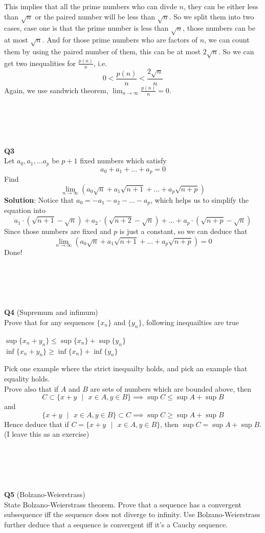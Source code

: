 \documentclass{article}
\newcommand{\tb}[1]{\textbf{#1}}
\begin{document}
This implies that all the prime numbers who can divde $n$, they can be either less than $\sqrt{n}$ or the paired
number will be less than $\sqrt{n}$. So we split them into two cases, case one is that the prime number is less than
$\sqrt{n}$, those numbers can be at most $\sqrt{n}$. And for those prime numbers who are factors of $n$, we can count them 
by using the paired number of them, this can be at most $2\sqrt{n}$. So we can get two inequalities for $\frac{p(n)}{n}$, i.e.
$$
0< \frac{p(n)}{n} < \frac{2\sqrt{n}}{n}
$$
Again, we use sandwich theorem, $\lim_{n \to \infty} \frac{p(n)}{n} = 0$.\\
\\
\\
\\
\\
\\
\tb{Q3}\\
Let $a_0, a_1, \dots a_p$ be $p+1$ fixed numbers which satisfy 
$$
a_0 + a_1 + \dots + a_p = 0
$$
Find 
$$
\lim_{n \to \infty} (a_0 \sqrt{n} + a_1 \sqrt{n+1} + \dots + a_p \sqrt{n+p})
$$
\tb{Solution}: Notice that $a_0 = - a_1 - a_2 -\dots - a_p$, which helps us to simplify the equation into
$$
a_1 \cdot (\sqrt{n+1}-\sqrt{n}) + a_2 \cdot (\sqrt{n+2}-\sqrt{n}) + \dots + a_p \cdot (\sqrt{n+p}-\sqrt{n})
$$
Since those numbers are fixed and $p$ is just a constant, so we can deduce that
$$
\lim_{n \to \infty} (a_0 \sqrt{n} + a_1 \sqrt{n+1} + \dots + a_p \sqrt{n+p}) = 0
$$
Done!\\
\\
\\
\\
\\
\\
\tb{Q4} (Supremum and infimum)\\
Prove that for any sequences $\{x_n\}$ and $\{y_n\}$, following inequailties are true
\begin{center}
    $\sup\{x_n + y_n\} \leq \sup\{x_n\} + \sup\{y_n\}$\\
    $\inf\{x_n + y_n\} \geq \inf\{x_n\} + \inf\{y_n\}$
\end{center}
Pick one example where the strict inequailty holds, and pick an example that equality holds.\\ Prove also that 
if $A$ and $B$ are sets of numbers which are bounded above, then
$$
C \subset \{x+y\text{ }|\text{ }x\in A, y \in B\} \implies \sup C \leq \sup A + \sup B
$$
and
$$
\{x+y\text{ }|\text{ }x\in A, y \in B\} \subset C \implies \sup C \geq \sup A + \sup B
$$
Hence deduce that if $C = \{x+y\text{ }|\text{ }x\in A, y \in B\}$, then $\sup C = \sup A + \sup B$.\\
(I leave this as an exercise)\\
\\
\\
\\
\\
\\
\tb{Q5} (Bolzano-Weierstrass)\\
State Bolzano-Weierstrass theorem. Prove that a sequence has a convergent subsequence iff the sequence does not diverge to infinity. 
Use Bolzano-Weierstrass further deduce that a sequence is convergent iff it's a Cauchy sequence.
\newpage
\end{document}

